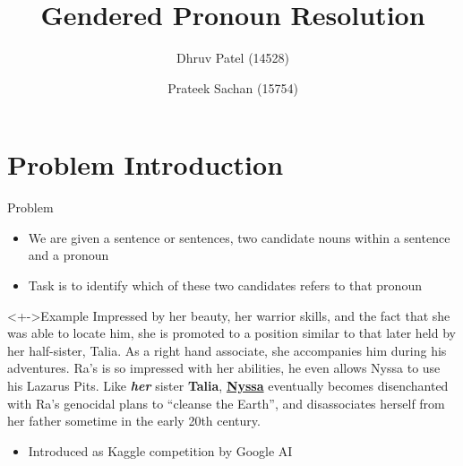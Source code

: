 \documentclass[10pt]{beamer}
\title{Gendered Pronoun Resolution}
\author[Dhruv, Prateek]{ Dhruv Patel (14528) \and Prateek Sachan (15754)}
\institute[CSA, IISc.]{Computer Science and Automation, Indian Institute of Science}
\begin{document}
\begin{frame}
  \maketitle
\end{frame}

\section{Problem Introduction}
\begin{frame}{Problem}
  \begin{itemize}
  \item<+-> We are given a sentence or sentences, two candidate nouns within a sentence and a pronoun
  \item<+-> Task is to identify which of these two candidates refers to that pronoun
  \end{itemize}

  \begin{block}<+->{Example}
    Impressed by her beauty, her warrior skills, and the fact that she was able to locate him, she is promoted to a position similar to that later held by her half-sister, Talia. As a right hand associate, she accompanies him during his adventures. Ra's is so impressed with her abilities, he even allows Nyssa to use his Lazarus Pits. Like \textit{\textbf{her}} sister \textbf{Talia}, \textbf{\underline{Nyssa}} eventually becomes disenchanted with Ra's genocidal plans to ``cleanse the Earth'', and disassociates herself from her father sometime in the early 20th century.
  \end{block}
  \begin{itemize}
  \item<+-> Introduced as Kaggle competition by Google AI
  \end{itemize}

\end{frame}
\end{document}
